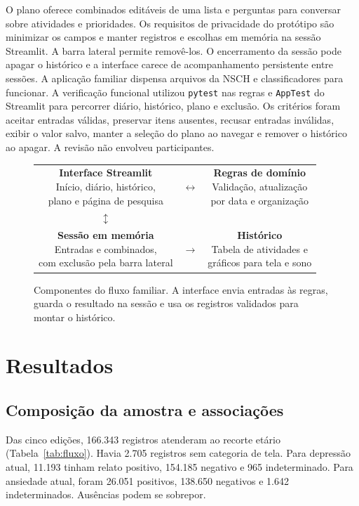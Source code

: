 ﻿\documentclass[12pt]{article}
\begin{document}
O plano oferece combinados editáveis de uma lista e perguntas para conversar sobre atividades e prioridades. Os requisitos de privacidade do protótipo são minimizar os campos e manter registros e escolhas em memória na sessão Streamlit. A barra lateral permite removê-los. O encerramento da sessão pode apagar o histórico e a interface carece de acompanhamento persistente entre sessões. A aplicação familiar dispensa arquivos da NSCH e classificadores para funcionar. A verificação funcional utilizou \texttt{pytest} nas regras e \texttt{AppTest} do Streamlit para percorrer diário, histórico, plano e exclusão. Os critérios foram aceitar entradas válidas, preservar itens ausentes, recusar entradas inválidas, exibir o valor salvo, manter a seleção do plano ao navegar e remover o histórico ao apagar. A revisão não envolveu participantes.

\begin{figure}[htbp]
\centering
\small
\begin{tabular}{ccc}
\fbox{\parbox[c][3.6em][c]{0.37\linewidth}{\centering\textbf{Interface Streamlit}\\Início, diário, histórico,\\plano e página de pesquisa}} & $\leftrightarrow$ &
\fbox{\parbox[c][3.6em][c]{0.40\linewidth}{\centering\textbf{Regras de domínio}\\Validação, atualização\\por data e organização}} \\
$\updownarrow$ & & \\
\fbox{\parbox[c][3.6em][c]{0.37\linewidth}{\centering\textbf{Sessão em memória}\\Entradas e combinados,\\com exclusão pela barra lateral}} & $\longrightarrow$ &
\fbox{\parbox[c][3.6em][c]{0.40\linewidth}{\centering\textbf{Histórico}\\Tabela de atividades e\\gráficos para tela e sono}}
\end{tabular}
\caption{Componentes do fluxo familiar. A interface envia entradas às regras, guarda o resultado na sessão e usa os registros validados para montar o histórico.}
\label{fig:fluxo-produto}
\end{figure}

\section{Resultados}
\subsection{Composição da amostra e associações}
Das cinco edições, 166.343 registros atenderam ao recorte etário (Tabela~\ref{tab:fluxo}). Havia 2.705 registros sem categoria de tela. Para depressão atual, 11.193 tinham relato positivo, 154.185 negativo e 965 indeterminado. Para ansiedade atual, foram 26.051 positivos, 138.650 negativos e 1.642 indeterminados. Ausências podem se sobrepor.
\end{document}

